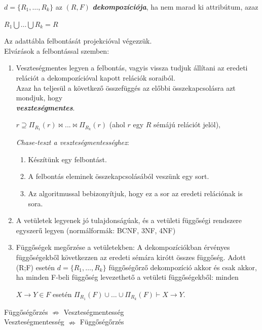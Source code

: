 \documentclass[tikz,12pt,margin=0px]{article}
\begin{document}
{    \noindent $d=\{R_1, \ldots, R_k\}$ az $(R, F)$ \emph{\textbf{dekompozíciója}}, ha nem marad ki attribútum, azaz
    \begin{center}
        $R_1\bigcup \ldots \bigcup R_k=R$
    \end{center}

    \noindent Az adattábla felbontását projekcióval végezzük.\\

	\noindent Elvárások a felbontással szemben:
	\begin{enumerate}
		\item Veszteségmentes legyen a felbontás, vagyis vissza tudjuk állítani az eredeti relációt a dekompozícióval kapott relációk soraiból.\\
        Azaz ha teljesül a következő összefüggés az előbbi összekapcsolásra azt mondjuk, hogy\\
        \emph{\textbf{veszteségmentes}}.
        \begin{center}
            $r \supseteq \Pi_{R_1}(r) \bowtie ... \bowtie \Pi_{R_k}(r)$ (ahol $r$ egy $R$ sémájú relációt jelöl),
        \end{center}

        \emph{Chase-teszt a veszteségmentességhez}:
        \begin{enumerate}
            \item Készítünk egy felbontást.
            \item A felbontás eleminek összekapcsolásából veszünk egy sort.
            \item Az algoritmussal bebizonyítjuk, hogy ez a sor az eredeti relációnak is sora.
        \end{enumerate}
    	\item A vetületek legyenek jó tulajdonságúak, és a vetületi függőségi rendszere egyszerű legyen (normálformák: BCNF, 3NF, 4NF)
    	\item Függőségek megőrzése a vetületekben: A dekompozíciókban érvényes függőségekből következzen az eredeti sémára kirótt összes függőség. Adott (R;F) esetén $d=\{R_1, \ldots, R_k\}$ függőségőrző dekompozíció akkor és csak akkor, ha minden F-beli függőség levezethető a vetületi függőségekből: minden
        \begin{center}
             $X \to Y \in F$ esetén $\Pi_{R_1}(F) \cup ... \cup \Pi_{R_k}(F) \vdash X \to Y$.
        \end{center}
	\end{enumerate}
    \begin{center}
        Függőségőrzés $\nRightarrow$ Veszteségmentesség\\
        Veszteségmentesség $\nRightarrow$ Függőségőrzés
    \end{center}

}
\end{document}
